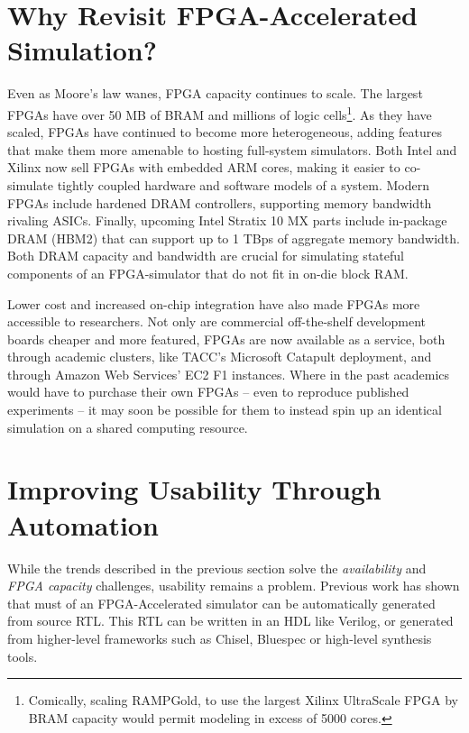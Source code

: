 \section{Why Revisit FPGA-Accelerated Simulation?}

Even as Moore's law wanes, FPGA capacity continues to scale. The largest FPGAs
have over 50 MB of BRAM and millions of logic cells\footnote{Comically, scaling
RAMPGold\cite{rampgold}, to use the largest Xilinx UltraScale
FPGA\cite{ultrascale} by BRAM capacity would permit modeling in excess of 5000
cores.}. As they have scaled, FPGAs have continued to become more
heterogeneous, adding features that make them more amenable to hosting
full-system simulators.  Both Intel and Xilinx now sell FPGAs with embedded ARM
cores, making it easier to co-simulate tightly coupled hardware and software
models of a system. Modern FPGAs include hardened DRAM controllers, supporting
memory bandwidth rivaling ASICs. Finally, upcoming Intel Stratix 10 MX parts
include in-package DRAM (HBM2) that can support up to 1 TBps of aggregate
memory bandwidth\cite{stratix10mx}. Both DRAM capacity and bandwidth are
crucial for simulating stateful components of an FPGA-simulator that do not fit
in on-die block RAM.

Lower cost and increased on-chip integration have also made FPGAs more
accessible to researchers.  Not only are commercial off-the-shelf development
boards cheaper and more featured, FPGAs are now available as a service, both
through academic clusters, like TACC's Microsoft
Catapult\cite{catapultannounce} deployment, and through Amazon Web Services'
EC2 F1 instances\cite{amazonf1}. Where in the past academics would have to
purchase their own FPGAs -- even to reproduce published experiments -- it may
soon be possible for them to instead spin up an identical simulation on a
shared computing resource.

\section{Improving Usability Through Automation}

While the trends described in the previous section solve the
\emph{availability} and \emph{FPGA capacity} challenges, usability remains a
problem. Previous work\cite{fabscalarfpga, strober} has shown that must of an
FPGA-Accelerated simulator can be automatically generated from source RTL. This
RTL can be written in an HDL like Verilog, or generated from higher-level
frameworks such as Chisel, Bluespec or high-level synthesis tools.

